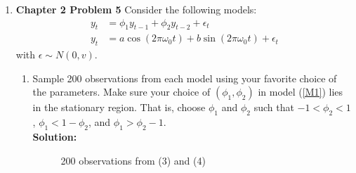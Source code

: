 \documentclass[12pt]{article}\usepackage[]{graphicx}\usepackage[]{color}
\newenvironment{knitrout}{}{} %
\begin{document}
\begin{enumerate}
	
	\item \textbf{Chapter 2 Problem 5} Consider the following models:
	\begin{align}
		y_t &= \phi _1 y_{t-1} + \phi _2 y_{t-2} + \epsilon _t \label{M1} \\
		y_t &= a \cos(2 \pi \omega _0 t) + b \sin(2 \pi \omega _0 t) + \epsilon _t \label{M2}
	\end{align}
	with $\epsilon \sim N(0, v)$.
	\begin{enumerate}
		\item Sample 200 observations from each model using your favorite choice of the parameters. Make sure your choice of $(\phi _1, \phi _2)$ in model (\ref{M1}) lies in the stationary region. That is, choose $\phi _1$ and $\phi _2$ such that $-1 < \phi _2 < 1$, $\phi _1 < 1 - \phi _2$, and $\phi _1 > \phi _2 - 1$.\\
		\textbf{Solution:}\\
\begin{knitrout}
\color{fgcolor}\begin{figure}[h]

{\centering {}

}

\caption[200 observations from (3) and (4)]{200 observations from (3) and (4)}\label{fig:Q4ts}
\end{figure}



\end{knitrout}
\end{enumerate}
\end{enumerate}
\end{document}
